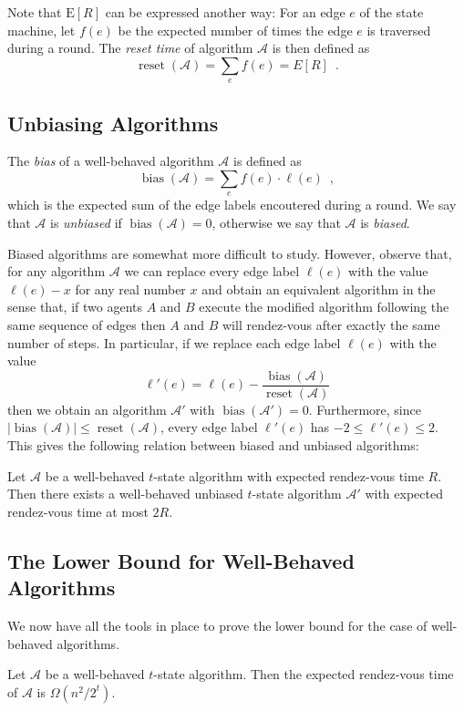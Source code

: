\documentclass[lotsofwhite]{patmorin}
\newcommand{\E}{\mathrm{E}}
\newcommand{\A}{\mathcal{A}}
\DeclareMathOperator{\bias}{bias}
\DeclareMathOperator{\reset}{reset}
\begin{document}
Note that $\E[R]$ can be expressed another way: For an edge $e$ of the
state machine, let $f(e)$ be the expected number of times the edge $e$
is traversed during a round.  The
\emph{reset time} of algorithm $\A$ is then defined as
\[
   \reset(\A) = \sum_e f(e) = E[R] \enspace .
\]

\subsection{Unbiasing Algorithms}

The \emph{bias} of a well-behaved algorithm $\A$ is defined as
\[
    \bias(\A) = \sum_{e} f(e)\cdot\ell(e) \enspace ,
\]
which is the expected sum of the edge labels encoutered during a round.
We say that $\A$ is \emph{unbiased} if $\bias(\A)=0$, otherwise we say
that $\A$ is \emph{biased}.

Biased algorithms are somewhat more difficult to study.  However,
observe that, for any algorithm $\mathcal{A}$ we can replace every
edge label $\ell(e)$ with the value $\ell(e)-x$ for any real number
$x$ and obtain an equivalent algorithm in the sense that, if two
agents $A$ and $B$ execute the modified algorithm following the same
sequence of edges then $A$ and $B$ will rendez-vous after exactly the
same number of steps.  In particular, if we replace each edge label
$\ell(e)$ with the value
\[
   \ell'(e) = \ell(e) - \frac{\bias(\A)}{\reset(\A)}
\]
then we obtain an algorithm $\A'$ with $\bias(\A')=0$.  Furthermore, since
$|\bias(\A)|\le\reset(\A)$, every edge label $\ell'(e)$ has
$-2 \le \ell'(e)\le 2$.  This gives the following relation between
biased and unbiased algorithms:

\begin{lem}
Let $\A$ be a well-behaved $t$-state algorithm with expected rendez-vous time
$R$.  Then there exists a well-behaved unbiased $t$-state algorithm $\A'$ with
expected rendez-vous time at most $2R$.
\end{lem}

\subsection{The Lower Bound for Well-Behaved Algorithms}

We now have all the tools in place to prove the lower bound for the
case of well-behaved algorithms.

\begin{lem}
Let $\A$ be a well-behaved $t$-state algorithm.  Then the expected rendez-vous
time of $\A$ is $\Omega(n^2/2^t)$.
\end{lem}
\end{document}
